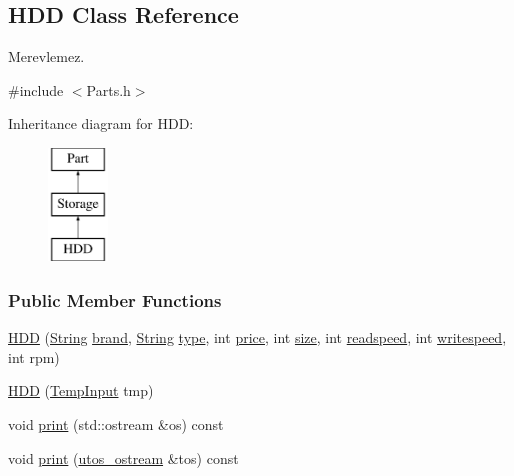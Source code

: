 \subsection{H\+DD Class Reference}
\label{class_h_d_d}


Merevlemez.  




{\ttfamily \#include $<$Parts.\+h$>$}

Inheritance diagram for H\+DD\+:\begin{figure}[H]
\begin{center}
\leavevmode
\includegraphics[height=3.000000cm]{class_h_d_d}
\end{center}
\end{figure}
\subsubsection*{Public Member Functions}
\begin{DoxyCompactItemize}
\item 
\mbox{\hyperlink{class_h_d_d_a375ad923cb64a11afc261fe1fac5276c}{H\+DD}} (\mbox{\hyperlink{class_string}{String}} \mbox{\hyperlink{class_part_ae06f2fdeb7fbbdb229a7aca151f3e341}{brand}}, \mbox{\hyperlink{class_string}{String}} \mbox{\hyperlink{class_part_a101dbcc5c4b21564df7414c7eb0eae88}{type}}, int \mbox{\hyperlink{class_part_a8e71223aed1da95a974f33d8d6c91bb1}{price}}, int \mbox{\hyperlink{class_storage_abcc80ce58a21fa884035617ee0b6cb67}{size}}, int \mbox{\hyperlink{class_storage_a41073842ff16961dad3903e6dd49bb0c}{readspeed}}, int \mbox{\hyperlink{class_storage_a0198a1483ccf849d48c76da88599ba8b}{writespeed}}, int rpm)
\item 
\mbox{\hyperlink{class_h_d_d_a98374b087d6a74476b914dedb2de1ec4}{H\+DD}} (\mbox{\hyperlink{struct_temp_input}{Temp\+Input}} tmp)
\item 
void \mbox{\hyperlink{class_h_d_d_a07c34356018542934a4dd91ce38b0821}{print}} (std\+::ostream \&os) const
\item 
void \mbox{\hyperlink{class_h_d_d_aca2c2583fa3304917905cd9185b64539}{print}} (\mbox{\hyperlink{structutos__ostream}{utos\+\_\+ostream}} \&tos) const
\end{DoxyCompactItemize}
